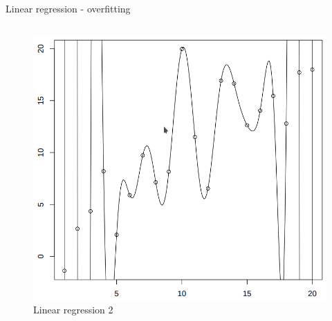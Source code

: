 \documentclass[aspectratio=169]{beamer}
\begin{document}
\begin{frame}{Linear regression - overfitting}
\begin{columns}
\begin{column}{0.5\textwidth}
\begin{center}
            \begin{figure}
                \includegraphics[scale=0.281]{./images/polyreg.png}
                \caption{Linear regression 2}
            \end{figure}
        \end{center}
    \end{column}
    \end{columns}
\end{frame}
\end{document}
